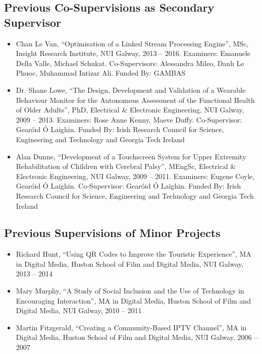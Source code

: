 \documentclass[10pt,a4paper]{res} %
\begin{document}
\begin{resume}
\subsection*{Previous Co-Supervisions as Secondary Supervisor}

\begin{itemize} \itemsep -2pt
\item Chan Le Van, ``Optimisation of a Linked Stream Processing Engine'', MSc, Insight Research Institute, NUI Galway, 2013 -- 2016. Examiners: Emanuele Della Valle, Michael Schukat. Co-Supervisors: Alessandra Mileo, Danh Le Phuoc, Muhammad Intizar Ali. Funded By: GAMBAS
\item Dr. Shane Lowe, ``The Design, Development and Validation of a Wearable Behaviour Monitor for the Autonomous Assessment of the Functional Health of Older Adults'', PhD, Electrical \& Electronic Engineering, NUI Galway, 2009 -- 2013. Examiners: Rose Anne Kenny, Maeve Duffy. Co-Supervisor: Gear\'{o}id \'{O} Laighin. Funded By: Irish Research Council for Science, Engineering and Technology and Georgia Tech Ireland
\item Alan Dunne, ``Development of a Touchscreen System for Upper Extremity Rehabilitation of Children with Cerebral Palsy'', MEngSc, Electrical \& Electronic Engineering, NUI Galway, 2009 -- 2011. Examiners: Eugene Coyle, Gear\'{o}id \'{O} Laighin. Co-Supervisor: Gear\'{o}id \'{O} Laighin. Funded By: Irish Research Council for Science, Engineering and Technology and Georgia Tech Ireland
\end{itemize}

\subsection*{Previous Supervisions of Minor Projects}

\begin{itemize} \itemsep -2pt
\item Richard Hunt, ``Using QR Codes to Improve the Touristic Experience'', MA in Digital Media, Huston School of Film and Digital Media, NUI Galway, 2013 -- 2014
\item Mary Murphy, ``A Study of Social Inclusion and the Use of Technology in Encouraging Interaction'', MA in Digital Media, Huston School of Film and Digital Media, NUI Galway, 2010 -- 2011
\item Martin Fitzgerald, ``Creating a Community-Based IPTV Channel'', MA in Digital Media, Huston School of Film and Digital Media, NUI Galway, 2006 -- 2007
\end{itemize}


\end{resume}
\end{document}
